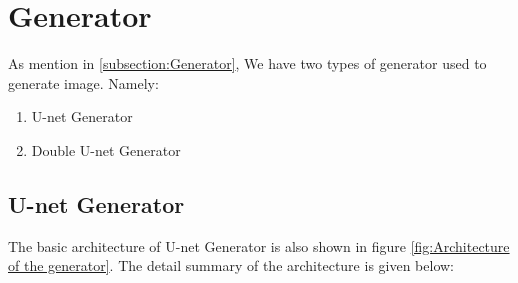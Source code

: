         \section{Generator}
            As mention in \ref{subsection:Generator}, We have two types of generator used to generate image. Namely: 
            \begin{enumerate}[label=\alph*.]
                \item U-net Generator
                \item Double U-net Generator
            \end{enumerate}
            \subsection{U-net Generator}
                The basic architecture of U-net Generator is also shown in figure \ref{fig:Architecture of the generator}. The detail summary of the architecture is given below: 
